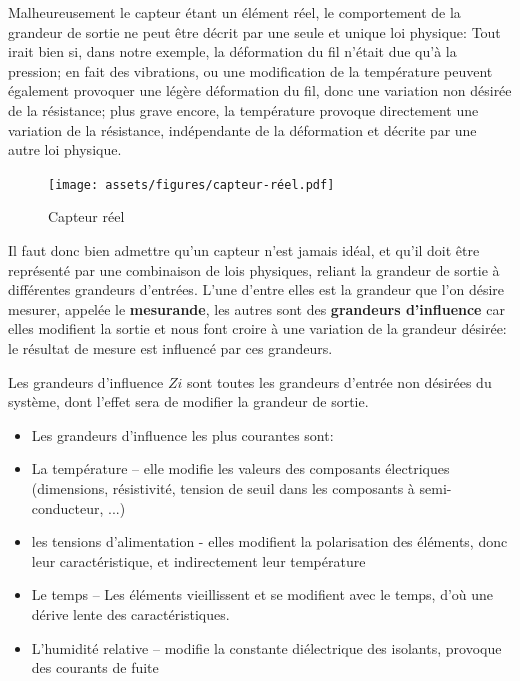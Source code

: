 Malheureusement le capteur étant un élément réel, le comportement de la grandeur de sortie ne peut être décrit par une seule et unique loi physique: Tout irait bien si, dans notre exemple, la déformation du fil n'était due qu'à la pression; en fait des vibrations, ou une modification de la température peuvent également provoquer une légère déformation du fil, donc une variation non désirée de la résistance; plus grave encore, la température provoque directement une variation de la résistance, indépendante de la déformation et décrite par une autre loi physique.
\begin{figure}
    \centering
    \texttt{[image: assets/figures/capteur-réel.pdf]}
    \caption{Capteur réel}
    \label{fig:Grandeur_Influence}
\end{figure}

Il faut donc bien admettre qu'un capteur n'est jamais idéal, et qu'il doit être représenté par une combinaison de lois physiques, reliant la grandeur de sortie à différentes grandeurs d'entrées. L'une d'entre elles est la grandeur que l'on désire mesurer, appelée le \textbf{mesurande}, les autres sont des \textbf{grandeurs d'influence} car elles modifient la sortie et nous font croire à une variation de la grandeur désirée: le résultat de mesure est influencé par ces grandeurs.

\begin{definition}
    Les grandeurs d'influence $Zi$ sont toutes les grandeurs d'entrée non désirées du système, dont l'effet sera de modifier la grandeur de sortie.
\end{definition}

\begin{itemize}
    \item Les grandeurs d'influence les plus courantes sont:
    \item La température -- elle modifie les valeurs des composants électriques (dimensions, résistivité, tension de seuil dans les composants à semi-conducteur, ...)
    \item les tensions d'alimentation - elles modifient la polarisation des éléments, donc leur caractéristique, et indirectement leur température
    \item Le temps -- Les éléments vieillissent et se modifient avec le temps, d'où une dérive lente des caractéristiques.
    \item L'humidité relative -- modifie la constante diélectrique des isolants, provoque des courants de fuite
\end{itemize}

